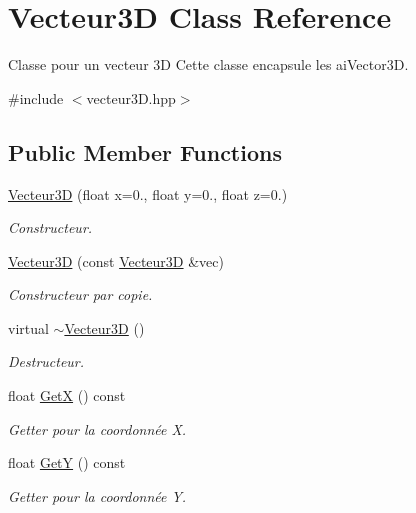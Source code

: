 \hypertarget{class_vecteur3_d}{\section{Vecteur3\+D Class Reference}
\label{class_vecteur3_d}
}


Classe pour un vecteur 3\+D Cette classe encapsule les ai\+Vector3\+D.  




{\ttfamily \#include $<$vecteur3\+D.\+hpp$>$}

\subsection*{Public Member Functions}
\begin{DoxyCompactItemize}
\item 
\hyperlink{class_vecteur3_d_aa2e1f3f01cadb1a3489ab0a5ee469b01}{Vecteur3\+D} (float x=0., float y=0., float z=0.)
\begin{DoxyCompactList}\small\item\em Constructeur. \end{DoxyCompactList}\item 
\hyperlink{class_vecteur3_d_ad7960e596005df06dc7404f0ebb4ad89}{Vecteur3\+D} (const \hyperlink{class_vecteur3_d}{Vecteur3\+D} \&vec)
\begin{DoxyCompactList}\small\item\em Constructeur par copie. \end{DoxyCompactList}\item 
virtual \hyperlink{class_vecteur3_d_a5f4633710eef6f25175fb811bf811112}{$\sim$\+Vecteur3\+D} ()
\begin{DoxyCompactList}\small\item\em Destructeur. \end{DoxyCompactList}\item 
float \hyperlink{class_vecteur3_d_a3a5374f1fd023d46a517f0875ed0d865}{Get\+X} () const 
\begin{DoxyCompactList}\small\item\em Getter pour la coordonnée X. \end{DoxyCompactList}\item 
float \hyperlink{class_vecteur3_d_a160e036f4b71271fd375bc14b2e1e78c}{Get\+Y} () const 
\begin{DoxyCompactList}\small\item\em Getter pour la coordonnée Y. \end{DoxyCompactList}\item 

\end{DoxyCompactItemize}
